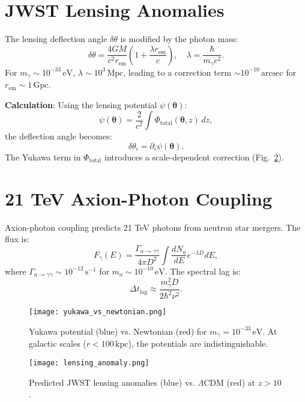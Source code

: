 \documentclass[12pt, a4paper]{article}
\begin{document}
\section{JWST Lensing Anomalies}  
\label{sec:lensing}  

The lensing deflection angle \( \delta \theta \) is modified by the photon mass:  
\begin{equation}  
\delta \theta = \frac{4GM}{c^2 r_{\text{em}}} \left(1 + \frac{\lambda r_{\text{em}}}{c}\right), \quad \lambda = \frac{\hbar}{m_\gamma c^2}.  
\label{eq:lensing}  
\end{equation}  
For \( m_\gamma \sim 10^{-33} \, \text{eV} \), \( \lambda \sim 10^3 \, \text{Mpc} \), leading to a correction term \( \sim 10^{-10} \, \text{arcsec} \) for \( r_{\text{em}} \sim 1 \, \text{Gpc} \).  

\textbf{Calculation}:  
Using the lensing potential \( \psi(\bm{\theta}) \):  
\begin{equation}  
\psi(\bm{\theta}) = \frac{2}{c^2} \int \Phi_{\text{total}}(\bm{\theta}, z) \, dz,  
\label{eq:lensing_potential}  
\end{equation}  
the deflection angle becomes:  
\begin{equation}  
\delta \theta_i = \partial_i \psi(\bm{\theta}).  
\label{eq:deflection}  
\end{equation}  
The Yukawa term in \( \Phi_{\text{total}} \) introduces a scale-dependent correction (Fig.~\ref{fig:lensing_anomaly}).  

\section{21 TeV Axion-Photon Coupling}  
\label{sec:axion}  

Axion-photon coupling predicts 21 TeV photons from neutron star mergers. The flux is:  
\begin{equation}  
F_\gamma(E) = \frac{\Gamma_{a \to \gamma\gamma}}{4\pi D^2} \int \frac{dN_a}{dE} e^{-\lambda D} dE,  
\label{eq:axion_flux}  
\end{equation}  
where \( \Gamma_{a \to \gamma\gamma} \sim 10^{-12} \, \text{s}^{-1} \) for \( m_a \sim 10^{-10} \, \text{eV} \). The spectral lag is:  
\begin{equation}  
\Delta t_{\text{lag}} \approx \frac{m_\gamma^2 D}{2\hbar^2 \nu^2}.  
\label{eq:lag}  
\end{equation}  

\begin{figure}[t]  
\centering  
\texttt{[image: yukawa\_vs\_newtonian.png]}  
\caption{Yukawa potential (blue) vs. Newtonian (red) for \( m_\gamma = 10^{-33} \, \text{eV} \). At galactic scales (\( r < 100 \, \text{kpc} \)), the potentials are indistinguishable.}  
\label{fig:yukawa}  
\end{figure}  

\begin{figure}[t]  
\centering  
\texttt{[image: lensing\_anomaly.png]}  
\caption{Predicted JWST lensing anomalies (blue) vs. \(\Lambda\)CDM (red) at \( z > 10 \).}  
\label{fig:lensing_anomaly}  
\end{figure}  
\end{document}
